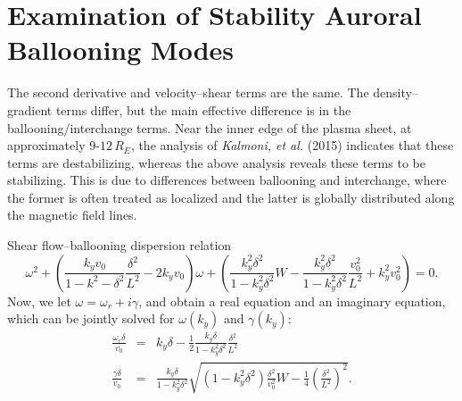 \documentclass[a4paper,openany,12pt]{book}
\begin{document}
\section{Examination of Stability Auroral Ballooning Modes}

The second derivative and velocity--shear terms are the same. The density--gradient terms differ, but the main effective difference is in the ballooning/interchange terms. Near the inner edge of the plasma sheet, at approximately 9-$12\,R_E$, the analysis of \emph{Kalmoni, et al.} (2015) indicates that these terms are destabilizing, whereas the above analysis reveals these terms to be stabilizing. This is due to differences between ballooning and interchange, where the former is often treated as localized and the latter is globally distributed along the magnetic field lines.

Shear flow--ballooning dispersion relation
\begin{equation}
\omega^2+\left(\frac{k_yv_0}{1-k^2-\delta^2}\frac{\delta^2}{L^2}-2k_yv_0\right)\omega+\left(\frac{k_y^2\delta^2}{1-k_y^2\delta^2}W-\frac{k_y^2\delta^2}{1-k_y^2\delta^2}\frac{v_0^2}{L^2}+k_y^2v_0^2\right)=0.\label{E9.115}
\end{equation}
Now, we let $\omega=\omega_r+i\gamma$, and obtain a real equation and an imaginary equation, which can be jointly solved for $\omega(k_y)$ and $\gamma(k_y)$:
\begin{eqnarray}
\frac{\omega_r\delta}{v_0}&=&k_y\delta-\frac{1}{2}\frac{k_y\delta}{1-k_y^2\delta^2}
\frac{\delta^2}{L^2}\label{E9.116}\\
\frac{\gamma\delta}{v_0}&=&\frac{k_y\delta}{1-k_y^2\delta^2}\sqrt{(1-k_y^2\delta^2)
\frac{\delta^2}{v_0^2}W-\frac{1}{4}\left(\frac{\delta^2}{L^2}\right)^2}. \label{E9.117}
\end{eqnarray}
\end{document}
